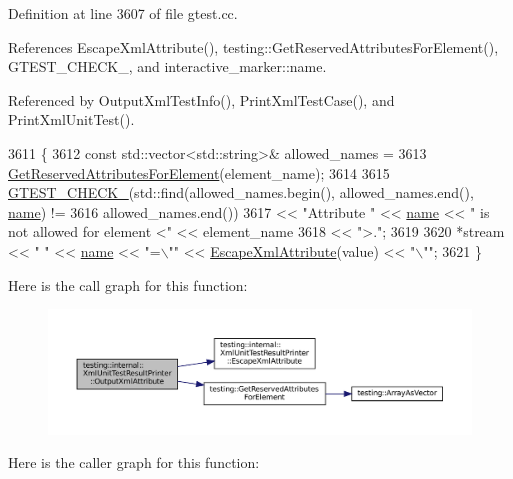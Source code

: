 Definition at line 3607 of file gtest.\+cc.



References Escape\+Xml\+Attribute(), testing\+::\+Get\+Reserved\+Attributes\+For\+Element(), G\+T\+E\+S\+T\+\_\+\+C\+H\+E\+C\+K\+\_\+, and interactive\+\_\+marker\+::name.



Referenced by Output\+Xml\+Test\+Info(), Print\+Xml\+Test\+Case(), and Print\+Xml\+Unit\+Test().


\begin{DoxyCode}
3611                             \{
3612   \textcolor{keyword}{const} std::vector<std::string>& allowed\_names =
3613       \hyperlink{namespacetesting_acb3fdfadf475a3c2f5e22a3dae73532a}{GetReservedAttributesForElement}(element\_name);
3614 
3615   \hyperlink{gtest-port_8h_ab54343f0a36dc4cb0ce8a478dd7847b8}{GTEST\_CHECK\_}(std::find(allowed\_names.begin(), allowed\_names.end(), 
      \hyperlink{namespaceinteractive__marker_a447655961b3d3ca3c5a2a9d3d769436d}{name}) !=
3616                    allowed\_names.end())
3617       << \textcolor{stringliteral}{"Attribute "} << \hyperlink{namespaceinteractive__marker_a447655961b3d3ca3c5a2a9d3d769436d}{name} << \textcolor{stringliteral}{" is not allowed for element <"} << element\_name
3618       << \textcolor{stringliteral}{">."};
3619 
3620   *stream << \textcolor{stringliteral}{" "} << \hyperlink{namespaceinteractive__marker_a447655961b3d3ca3c5a2a9d3d769436d}{name} << \textcolor{stringliteral}{"=\(\backslash\)""} << \hyperlink{classtesting_1_1internal_1_1XmlUnitTestResultPrinter_aad574d7bb0c24578d5acc57817b9d367}{EscapeXmlAttribute}(value) << \textcolor{stringliteral}{"\(\backslash\)""};
3621 \}
\end{DoxyCode}
Here is the call graph for this function\+:
\nopagebreak
\begin{figure}[H]
\begin{center}
\leavevmode
\includegraphics[width=350pt]{classtesting_1_1internal_1_1XmlUnitTestResultPrinter_aa8ca7066de948d26d171597430c75839_cgraph}
\end{center}
\end{figure}
Here is the caller graph for this function\+:
